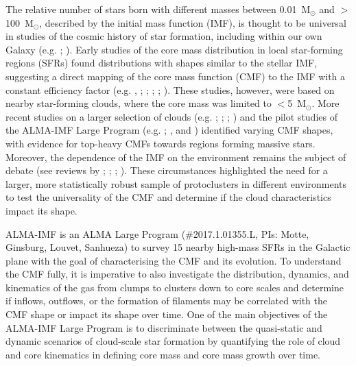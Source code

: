 \documentclass[longauth]{aa} %
\begin{document}
The relative number of stars born with different masses between 0.01~M$_{\odot}$ and $>$100~M$_{\odot}$, described by the initial mass function (IMF), is thought to be universal in studies of the cosmic history of star formation, including within our own Galaxy (e.g. \citealt{bastian10}; \citealt{kroupa13}). Early studies of the core mass distribution in local star-forming regions (SFRs) found distributions with shapes similar to the stellar IMF, suggesting a direct mapping of the core mass function (CMF) to the IMF with a constant efficiency factor  (e.g. \citealt{Motte1998}, \citealt{motte01}; \citealt{TeSa98}; \citealt{alves07}; \citealt{Enoch2008}; \citealt{konyves15}). These studies, however, were based on nearby star-forming clouds, where the core mass was limited to $<$5~M$_{\odot}$. More recent studies on a larger selection of clouds (e.g. \citealt{zhang15}; \citealt{ohashi16}; \citealt{csengeri17a}; \citealt{lu20}) and the pilot studies of the ALMA-IMF Large Program (e.g. \citealt{ginsburg17}; \citealt{Motte2018}, and \citealt{sanhueza19}) identified varying CMF shapes, with evidence for top-heavy CMFs towards regions forming massive stars. Moreover, the dependence of the IMF on the environment remains the subject of debate (see reviews by \citealt{offner14}; \citealt{krumholz15}; \citealt{ballesteros20}; \citealt{lee20}). These circumstances highlighted the need for a larger, more statistically robust sample of protoclusters in different environments to test the universality of the CMF and determine if the cloud characteristics impact its shape. 

ALMA-IMF is an ALMA Large Program (\#2017.1.01355.L, PIs: Motte, Ginsburg, Louvet, Sanhueza) to survey 15 nearby high-mass SFRs in the Galactic plane with the goal of characterising the CMF and its evolution. To understand the CMF fully, it is imperative to also investigate the distribution, dynamics, and kinematics of the gas from clumps to clusters down to core scales and determine if inflows, outflows, or the formation of filaments may be correlated with the CMF shape or impact its shape over time. One of the main objectives of the ALMA-IMF Large Program is to discriminate between the quasi-static and dynamic scenarios of cloud-scale star formation by quantifying the role of cloud and core kinematics in defining core mass and core mass growth over time. 
\end{document}
